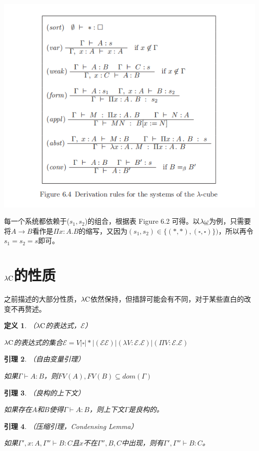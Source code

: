 \documentclass[UTF8]{article}
\newtheorem{thm}{定义}[section]
\newtheorem{lemma}[thm]{引理}
\begin{document}
		\noindent
		\includegraphics[width=0.93\linewidth]{"../imgs/6-4.png"}
		
		每一个系统都依赖于($s_1,s_2$)的组合，根据表 Figure 6.2 可得。以$\lambda{\uline{\omega}}$为例，只需要将$A\rightarrow B$看作是$\Pi x:A.B$的缩写，又因为$(s_1,s_2)\in\{(*,*),(\square,\square)\})$，所以再令$s_1=s_2=s$即可。
		
	\section{$\lambda{\rm C}$的性质}
	\noindent
	之前描述的大部分性质，$\lambda{\rm C}$依然保持，但措辞可能会有不同，对于某些直白的改变不再赘述。
	
		\begin{thm}（$\lambda{\rm C}$的表达式，$\mathcal{E}$）
			
			$\lambda{\rm C}$的表达式的集合$\mathcal{E} = V|\square|*|(\mathcal{EE})|(\lambda V:\mathcal{E}.\mathcal{E})|(\Pi V:\mathcal{E}.\mathcal{E})$
		\end{thm}
	
		\begin{lemma}（自由变量引理）
			
			如果$\Gamma\vdash A:B$，则$FV(A),FV(B)\subseteq dom(\Gamma)$
		\end{lemma}
		
		\begin{lemma}（良构的上下文）
			
			如果存在$A$和$B$使得$\Gamma\vdash A:B$，则上下文$\Gamma$是良构的。
		\end{lemma}
	
		\begin{lemma}（压缩引理，Condensing Lemma）
			
			如果$\Gamma',x:A,\Gamma''\vdash B:C$且$x$不在$\Gamma'', B, C$中出现，则有$\Gamma', \Gamma''\vdash B:C$。
		\end{lemma}
	
\end{document}
